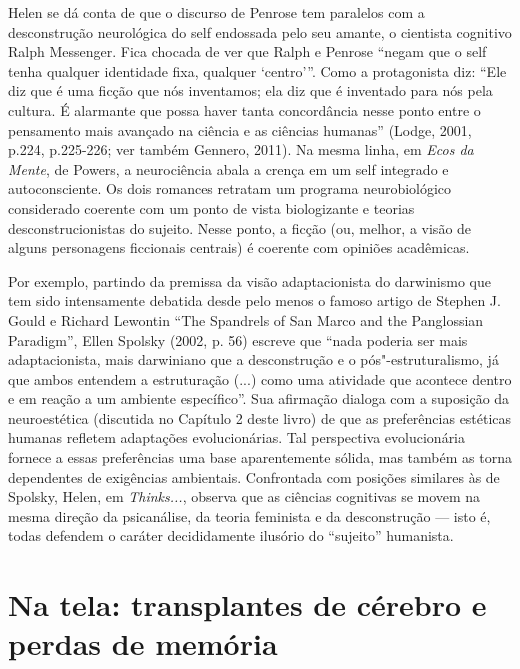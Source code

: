 Helen se dá conta de que o discurso de Penrose tem paralelos com a
desconstrução neurológica do self endossada pelo seu amante, o cientista
cognitivo Ralph Messenger. Fica chocada de ver que Ralph e Penrose
``negam que o self tenha qualquer identidade fixa, qualquer `centro'''.
Como a protagonista diz: ``Ele diz que é uma ficção que nós inventamos;
ela diz que é inventado para nós pela cultura. É alarmante que possa
haver tanta concordância nesse ponto entre o pensamento mais avançado na
ciência e as ciências humanas'' (Lodge, 2001, p.224, p.225-226; ver
também Gennero, 2011). Na mesma linha, em \emph{Ecos da Mente}, de
Powers, a neurociência abala a crença em um self integrado e
autoconsciente. Os dois romances retratam um programa neurobiológico
considerado coerente com um ponto de vista biologizante e teorias
desconstrucionistas do sujeito. Nesse ponto, a ficção (ou, melhor, a
visão de alguns personagens ficcionais centrais) é coerente com opiniões
acadêmicas.

Por exemplo, partindo da premissa da visão adaptacionista do darwinismo
que tem sido intensamente debatida desde pelo menos o famoso artigo de
Stephen J. Gould e Richard Lewontin ``The Spandrels of San Marco and the
Panglossian Paradigm'', Ellen Spolsky (2002, p. 56) escreve que ``nada
poderia ser mais adaptacionista, mais darwiniano que a desconstrução e o
pós"-estruturalismo, já que ambos entendem a estruturação (...) como uma
atividade que acontece dentro e em reação a um ambiente específico''.
Sua afirmação dialoga com a suposição da neuroestética (discutida no
Capítulo 2 deste livro) de que as preferências estéticas humanas
refletem adaptações evolucionárias. Tal perspectiva evolucionária
fornece a essas preferências uma base aparentemente sólida, mas também
as torna dependentes de exigências ambientais. Confrontada com posições
similares às de Spolsky, Helen, em \emph{Thinks...}, observa que as
ciências cognitivas se movem na mesma direção da psicanálise, da teoria
feminista e da desconstrução --- isto é, todas defendem o caráter
decididamente ilusório do ``sujeito'' humanista.

\chapter{Na tela: transplantes de cérebro e perdas de memória}

